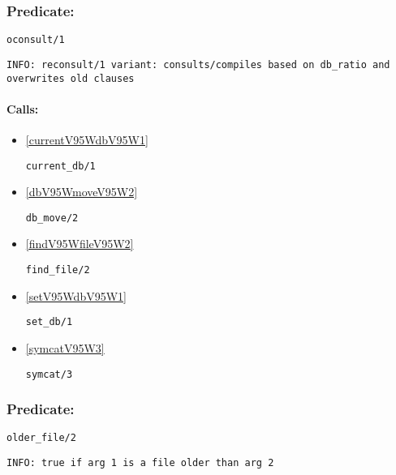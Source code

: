 \subsubsection{Predicate:} \label{oconsultV95W1}

\begin{verbatim}
oconsult/1
\end{verbatim}

{\small \begin{verbatim}
INFO: reconsult/1 variant: consults/compiles based on db_ratio and overwrites old clauses

\end{verbatim}}
\paragraph{Calls:} 
\begin{itemize}
\item \ref{currentV95WdbV95W1} 
\begin{verbatim}
current_db/1
\end{verbatim}

\item \ref{dbV95WmoveV95W2} 
\begin{verbatim}
db_move/2
\end{verbatim}

\item \ref{findV95WfileV95W2} 
\begin{verbatim}
find_file/2
\end{verbatim}

\item \ref{setV95WdbV95W1} 
\begin{verbatim}
set_db/1
\end{verbatim}

\item \ref{symcatV95W3} 
\begin{verbatim}
symcat/3
\end{verbatim}

\end{itemize}

\subsubsection{Predicate:} \label{olderV95WfileV95W2}

\begin{verbatim}
older_file/2
\end{verbatim}

{\small \begin{verbatim}
INFO: true if arg 1 is a file older than arg 2

\end{verbatim}}

